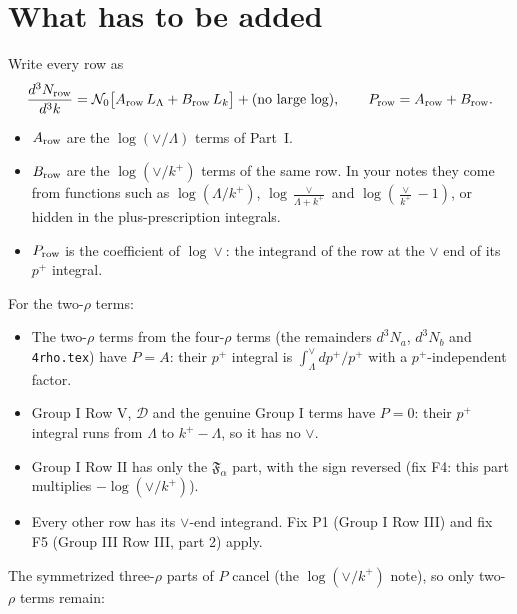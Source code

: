 \documentclass[10pt]{article}
\numberwithin{equation}{section}
\newcommand{\NO}{\mathcal N_0}
\newcommand{\LL}{L_\Lambda}
\newcommand{\Lk}{L_k}
\begin{document}
\section{What has to be added}\label{sec:P}
Write every row as
\begin{equation*}
\frac{d^3N_{\rm row}}{d^3k}=\NO\big[A_{\rm row}\,\LL+B_{\rm row}\,\Lk\big]+(\text{no large log}),\qquad P_{\rm row}=A_{\rm row}+B_{\rm row}.
\end{equation*}
\begin{itemize}
\item $A_{\rm row}$ are the $\log(\vee/\Lambda)$ terms of Part~I.
\item $B_{\rm row}$ are the $\log(\vee/k^+)$ terms of the same row. In your notes they come from functions such as $\log(\Lambda/k^+)$, $\log\frac\vee{\Lambda+k^+}$ and $\log(\frac\vee{k^+}-1)$, or hidden in the plus-prescription integrals.
\item $P_{\rm row}$ is the coefficient of $\log\vee$: the integrand of the row at the $\vee$ end of its $p^+$ integral.
\end{itemize}
For the two-$\rho$ terms:
\begin{itemize}
\item The two-$\rho$ terms from the four-$\rho$ terms (the remainders $d^3N_a$, $d^3N_b$ and \texttt{4rho.tex}) have $P=A$: their $p^+$ integral is $\int_\Lambda^\vee dp^+/p^+$ with a $p^+$-independent factor.
\item Group I Row V, $\mathcal D$ and the genuine Group I terms have $P=0$: their $p^+$ integral runs from $\Lambda$ to $k^+-\Lambda$, so it has no $\vee$.
\item Group I Row II has only the $\mathfrak F_\alpha$ part, with the sign reversed (fix F4: this part multiplies $-\log(\vee/k^+)$).
\item Every other row has its $\vee$-end integrand. Fix P1 (Group I Row III) and fix F5 (Group III Row III, part 2) apply.
\end{itemize}
The symmetrized three-$\rho$ parts of $P$ cancel (the $\log(\vee/k^+)$ note), so only two-$\rho$ terms remain:
\end{document}

